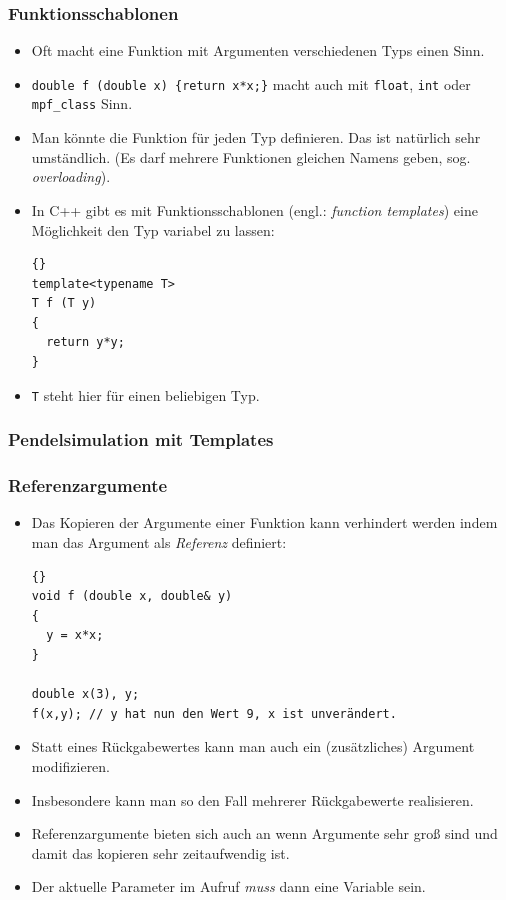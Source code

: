 \begin{frame}[fragile]
\frametitle{Funktionsschablonen}
\begin{itemize}
\item Oft macht eine Funktion mit Argumenten verschiedenen Typs einen Sinn.
\item \lstinline!double f (double x) {return x*x;}! macht auch mit
  \lstinline{float}, \lstinline{int} oder \lstinline{mpf_class} Sinn.
\item Man könnte die Funktion für jeden Typ definieren. Das ist
  natürlich sehr umständlich. (Es darf mehrere Funktionen gleichen
  Namens geben, sog. \textsl{overloading}).
\item In C++ gibt es mit Funktionsschablonen (engl.: \textsl{function
  templates}) eine Möglichkeit den Typ variabel zu lassen:
{\scriptsize\begin{lstlisting}{}
template<typename T>
T f (T y)
{
  return y*y;
}
\end{lstlisting}}
\item \lstinline{T} steht hier für einen beliebigen Typ.
\end{itemize}
\end{frame}

\begin{frame}
\frametitle{Pendelsimulation mit Templates}

\end{frame}

\begin{frame}[fragile]
\frametitle{Referenzargumente}
\begin{itemize}
\item Das Kopieren der Argumente einer Funktion kann verhindert werden
  indem man das Argument als \textsl{Referenz} definiert:
{\scriptsize\begin{lstlisting}{}
void f (double x, double& y)
{
  y = x*x;
}

double x(3), y;
f(x,y); // y hat nun den Wert 9, x ist unverändert.
\end{lstlisting}}
\item Statt eines Rückgabewertes kann man auch ein (zusätzliches)
  Argument modifizieren.
\item Insbesondere kann man so den Fall mehrerer Rückgabewerte
  realisieren.
\item Referenzargumente bieten sich auch an wenn Argumente \glqq{}sehr
  groß\grqq{} sind und damit das kopieren sehr zeitaufwendig ist.
\item Der aktuelle Parameter im Aufruf \textsl{muss} dann eine Variable sein.
\end{itemize}
\end{frame}
